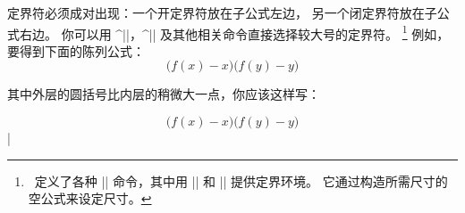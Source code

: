{%
定界符必须成对出现：一个开定界符放在子公式左边，
另一个闭定界符放在子公式右边。
你可以用 ^|\bigl|，^|\bigr| 及其他相关命令\ctsref{\bigl}直接选择较大号的定界符。
\footnote
{\PlainTeX\ 定义了各种 |\big| 命令，其中用 |\left| 和 |\right| 提供定界环境。
它通过构造所需尺寸的空公式来设定尺寸。}
例如，要得到下面的陈列公式：
$$\bigl(f(x) - x \bigr) \bigl(f(y) - y \bigr)$$

\noindent 其中外层的圆括号比内层的稍微大一点，你应该这样写：

\csdisplay
$$\bigl( f(x) - x \bigr) \bigl( f(y) - y \bigr)$$
|

}
